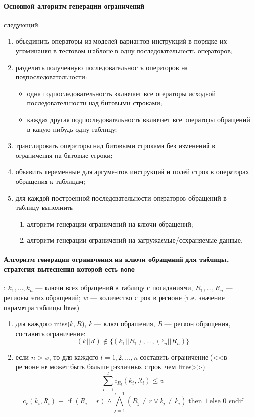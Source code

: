 \paragraph{Основной алгоритм генерации ограничений} следующий:
\begin{enumerate}
    \item объединить операторы из моделей вариантов инструкций в порядке их упоминания в тестовом шаблоне в одну последовательность операторов;
    \item разделить полученную последовательность операторов на
подпоследовательности:
            \begin{itemize}
                \item одна подпоследовательность включает все операторы исходной
последовательности над битовыми строками;
                \item каждая другая подпоследовательность включает все операторы
обращений в какую-нибудь одну таблицу;
            \end{itemize}
    \item транслировать операторы над битовыми строками без изменений в
ограничения на битовые строки;
    \item объявить переменные для аргументов инструкций и полей строк в
операторах обращения к таблицам;
    \item для каждой построенной последовательности операторов обращений в таблицу выполнить
            \begin{enumerate}
                \item алгоритм генерации ограничений на ключи обращений;
                \item алгоритм генерации ограничений на загружаемые/сохраняемые
данные.
            \end{enumerate}
\end{enumerate}

\paragraph{Алгоритм генерации ограничения на ключи обращений для таблицы,
стратегия вытеснения которой есть \texttt{none}}: $k_1, ..., k_n$ --- ключи всех
обращений в таблицу с попаданиями, $R_1, ..., R_n$ --- регионы этих обращений;
$w$ --- количество строк в регионе (т.е. значение параметра таблицы lines)

\begin{enumerate}
    \item для каждого miss($k, R$), $k$ --- ключ обращения, $R$ --- регион
обращения, составить ограничение: $$(k||R) \notin \{(k_1||R_1), ..., (k_n||R_n)
\}$$

    \item если $n > w$, то для каждого $l = 1, 2, \dots, n$ составить
ограничение (<<в регионе не может быть больше различных строк, чем lines>>)
$$\sum_{i=1}^l c_{R_l} (k_i, R_i) \leqslant w$$
$$c_r (k_i, R_i) \equiv \mbox{~if~} (R_i = r ) \wedge \bigwedge_{j=1}^{i-1} (R_j
\neq r \vee k_j \neq k_i) \mbox{~then~} 1 \mbox{~else~} 0 \mbox{~endif}$$
\end{enumerate}

